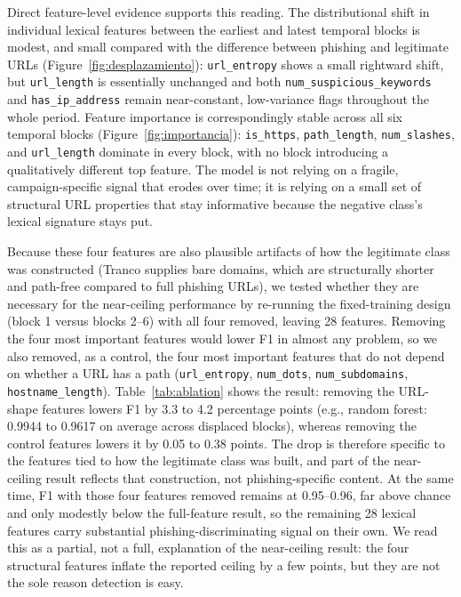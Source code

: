 \documentclass[10pt, a4paper, oneside]{article}
\begin{document}
Direct feature-level evidence supports this reading. The distributional shift in individual lexical features between the earliest and latest temporal blocks is modest, and small compared with the difference between phishing and legitimate URLs (Figure~\ref{fig:desplazamiento}): \texttt{url\_entropy} shows a small rightward shift, but \texttt{url\_length} is essentially unchanged and both \texttt{num\_suspicious\_keywords} and \texttt{has\_ip\_address} remain near-constant, low-variance flags throughout the whole period. Feature importance is correspondingly stable across all six temporal blocks (Figure~\ref{fig:importancia}): \texttt{is\_https}, \texttt{path\_length}, \texttt{num\_slashes}, and \texttt{url\_length} dominate in every block, with no block introducing a qualitatively different top feature. The model is not relying on a fragile, campaign-specific signal that erodes over time; it is relying on a small set of structural URL properties that stay informative because the negative class's lexical signature stays put.

Because these four features are also plausible artifacts of how the legitimate class was constructed (Tranco supplies bare domains, which are structurally shorter and path-free compared to full phishing URLs), we tested whether they are necessary for the near-ceiling performance by re-running the fixed-training design (block 1 versus blocks 2--6) with all four removed, leaving 28 features. Removing the four most important features would lower F1 in almost any problem, so we also removed, as a control, the four most important features that do not depend on whether a URL has a path (\texttt{url\_entropy}, \texttt{num\_dots}, \texttt{num\_subdomains}, \texttt{hostname\_length}). Table~\ref{tab:ablation} shows the result: removing the URL-shape features lowers F1 by 3.3 to 4.2 percentage points (e.g., random forest: 0.9944 to 0.9617 on average across displaced blocks), whereas removing the control features lowers it by 0.05 to 0.38 points. The drop is therefore specific to the features tied to how the legitimate class was built, and part of the near-ceiling result reflects that construction, not phishing-specific content. At the same time, F1 with those four features removed remains at 0.95--0.96, far above chance and only modestly below the full-feature result, so the remaining 28 lexical features carry substantial phishing-discriminating signal on their own. We read this as a partial, not a full, explanation of the near-ceiling result: the four structural features inflate the reported ceiling by a few points, but they are not the sole reason detection is easy.
\end{document}

